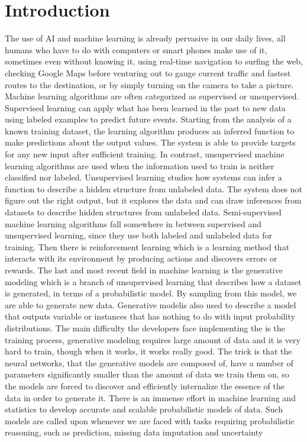 
\pagestyle{fancy}  
\chapter*{Introduction}
\vspace{5 pt}

The use of AI and machine learning is already pervasive in our daily lives, all humans who have to do with computers or smart phones make use of it, sometimes even without knowing it, using real-time navigation to surfing the web, checking Google Maps before venturing out to gauge current traffic and fastest routes to the destination, or by simply turning on the camera to take a picture. Machine learning algorithms are often categorized as supervised or unsupervised. Supervised learning can apply what has been learned in the past to new data using labeled examples to predict future events. Starting from the analysis of a known training dataset, the learning algorithm produces an inferred function to make predictions about the output values. The system is able to provide targets for any new input after sufficient training. In contrast, unsupervised machine learning algorithms are used when the information used to train is neither classified nor labeled. Unsupervised learning studies how systems can infer a function to describe a hidden structure from unlabeled data. The system does not figure out the right output, but it explores the data and can draw inferences from datasets to describe hidden structures from unlabeled data. Semi-supervised machine learning algorithms fall somewhere in between supervised and unsupervised learning, since they use both labeled and unlabeled data for training. Then there is reinforcement learning which is a learning method that interacts with its environment by producing actions and discovers errors or rewards. The last and most recent field in machine learning is the generative modeling which is a branch of unsupervised learning that describes how a dataset is generated, in terms of a probabilistic model. By sampling from this model, we are able to generate new data. \textacutedbl Generative model\textgravedbl  is also used to describe a model that outputs variable or instances that has nothing to do with input probability distributions. The main difficulty the developers face implementing the is the training process, generative modeling requires large amount of data and it is very hard to train, though when it works, it works really good. The trick is that the neural networks, that the generative models are composed of, have a number of parameters significantly smaller than the amount of data we train them on, so the models are forced to discover and efficiently internalize the essence of the data in order to generate it. There is an immense effort in machine learning and statistics to develop accurate and scalable probabilistic models of data. Such models are called upon whenever we are faced with tasks requiring probabilistic reasoning, such as prediction, missing data imputation and uncertainty 